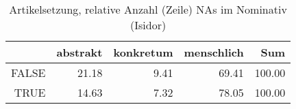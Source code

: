 \begin{table}[ht]
\centering
\begin{tabular}{rrrrr}
  \hline
 & abstrakt & konkretum & menschlich & Sum \\ 
  \hline
FALSE & 21.18 & 9.41 & 69.41 & 100.00 \\ 
  TRUE & 14.63 & 7.32 & 78.05 & 100.00 \\ 
   \hline
\end{tabular}
\caption{Artikelsetzung, relative Anzahl (Zeile) NAs im Nominativ (Isidor)} 
\end{table}
